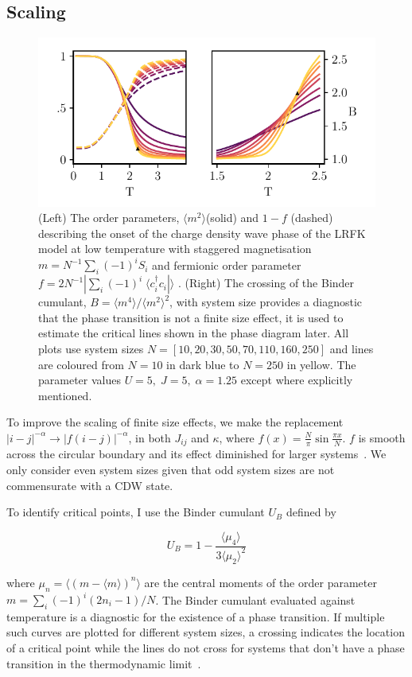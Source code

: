 \hypertarget{scaling}{%
\subsection{Scaling}\label{scaling}}

\hypertarget{fig:binder_cumulants}{%
\begin{figure}
\centering
\includegraphics[width=1\textwidth,height=\textheight]{figure_code/fk_chapter/binder_cumulants/binder_cumulants}
\caption[{Binder Cumulants}]{(Left) The order parameters, \(\langle m^2 \rangle\)(solid) and \(1 - f\) (dashed) describing the onset of the charge density wave phase of the LRFK model at low temperature with staggered magnetisation \(m = N^{-1} \sum_i (-1)^i S_i\) and fermionic order parameter \(f = 2 N^{-1}|\sum_i (-1)^i \; \langle c^\dagger_{i}c_{i}| \rangle\) . (Right) The crossing of the Binder cumulant, \(B = \langle m^4 \rangle / \langle m^2 \rangle^2\), with system size provides a diagnostic that the phase transition is not a finite size effect, it is used to estimate the critical lines shown in the phase diagram later. All plots use system sizes \(N = [10,20,30,50,70,110,160,250]\) and lines are coloured from \(N = 10\) in dark blue to \(N = 250\) in yellow. The parameter values \(U = 5,\;J = 5,\;\alpha = 1.25\) except where explicitly mentioned.}
\label{fig:binder_cumulants}
\end{figure}
}

To improve the scaling of finite size effects, we make the replacement \(|i - j|^{-\alpha} \rightarrow |f(i - j)|^{-\alpha}\), in both \(J_{ij}\) and \(\kappa\), where \(f(x) = \frac{N}{\pi}\sin \frac{\pi x}{N}\). \(f\) is smooth across the circular boundary and its effect diminished for larger systems~\autocite{fukuiOrderNClusterMonte2009}. We only consider even system sizes given that odd system sizes are not commensurate with a CDW state.

To identify critical points, I use the Binder cumulant \(U_B\) defined by

\[
U_B = 1 - \frac{\langle\mu_4\rangle}{3\langle\mu_2\rangle^2}
\]

where \(\mu_n = \langle(m - \langle m\rangle)^n\rangle\) are the central moments of the order parameter \(m = \sum_i (-1)^i (2n_i - 1) / N\). The Binder cumulant evaluated against temperature is a diagnostic for the existence of a phase transition. If multiple such curves are plotted for different system sizes, a crossing indicates the location of a critical point while the lines do not cross for systems that don't have a phase transition in the thermodynamic limit~\autocite{binderFiniteSizeScaling1981,musialMonteCarloSimulations2002}.
